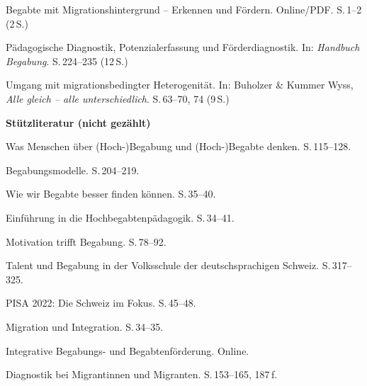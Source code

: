 \documentclass[ngerman, a4paper]{article}
\begin{document}
\begin{litdesc}
  \item[\cite{kellerkoller2013erkennen}] Begabte mit Migrationshintergrund -- Erkennen und Fördern.
    Online/PDF. S.\,1--2 (2\,S.)

  \item[\cite{muelleroppliger2021paeddiagnostik}] Pädagogische Diagnostik, Potenzialerfassung und Förderdiagnostik.
    In: \textit{Handbuch Begabung}.
    S.\,224--235 (12\,S.)

  \item[\cite{kappus2010migration}] Umgang mit migrationsbedingter Heterogenität.
    In: Buholzer \& Kummer Wyss, \textit{Alle gleich -- alle unterschiedlich}.
    S.\,63--70, 74 (9\,S.)
\end{litdesc}

\textbf{Stützliteratur (nicht gezählt)}

\begin{litdesc}
  \item[\cite{baudson2021wasdenken}] Was Menschen über
    (Hoch-)Begabung und (Hoch-)Begabte denken. S.\,115--128.

  \item[\cite{muelleroppliger2021begabungsmodelle}] Begabungsmodelle.
    S.\,204--219.

  \item[\cite{baudson2025besserfinden}] Wie wir Begabte besser finden
    können. S.\,35--40.

  \item[\cite{trautmann2016einfuehrung}] Einführung in die
    Hochbegabtenpädagogik. S.\,34--41.

  \item[\cite{lehwald2017motivation}] Motivation trifft Begabung.
    S.\,78--92.

  \item[\cite{grossenbacher2014integrative}] Talent und Begabung in der
    Volksschule der deutschsprachigen Schweiz. S.\,317--325.

  \item[\cite{erzinger2023pisa}] PISA 2022: Die Schweiz im Fokus.
    S.\,45--48.

  \item[\cite{bfs2022migration}] Migration und Integration.
    S.\,34--35.

  \item[\cite{dvs2025bbf}] Integrative Begabungs- und
    Begabtenförderung. Online.

  \item[\cite{maehler2018diagnostik}] Diagnostik bei Migrantinnen und
    Migranten. S.\,153--165, 187\,f.
\end{litdesc}
 
\end{document}
